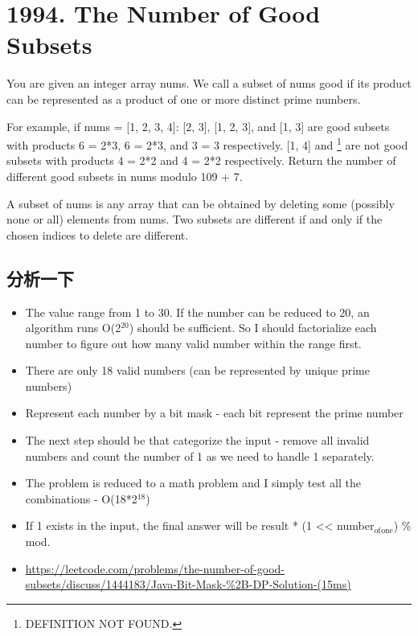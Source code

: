 \documentclass[9pt, b5paaper]{book}
\begin{document}
\section{1994. The Number of Good Subsets}
\label{sec-11-11}
You are given an integer array nums. We call a subset of nums good if its product can be represented as a product of one or more distinct prime numbers.

For example, if nums = [1, 2, 3, 4]:
[2, 3], [1, 2, 3], and [1, 3] are good subsets with products 6 = 2*3, 6 = 2*3, and 3 = 3 respectively.
[1, 4] and \footnote{DEFINITION NOT FOUND.} are not good subsets with products 4 = 2*2 and 4 = 2*2 respectively.
Return the number of different good subsets in nums modulo 109 + 7.

A subset of nums is any array that can be obtained by deleting some (possibly none or all) elements from nums. Two subsets are different if and only if the chosen indices to delete are different.
\subsection{分析一下}
\label{sec-11-11-1}
\begin{itemize}
\item The value range from 1 to 30. If the number can be reduced to 20, an algorithm runs O(2$^{\text{20}}$) should be sufficient. So I should factorialize each number to figure out how many valid number within the range first.
\item There are only 18 valid numbers (can be represented by unique prime numbers)
\item Represent each number by a bit mask - each bit represent the prime number
\item The next step should be that categorize the input - remove all invalid numbers and count the number of 1 as we need to handle 1 separately.
\item The problem is reduced to a math problem and I simply test all the combinations - O(18*2$^{\text{18}}$)
\item If 1 exists in the input, the final answer will be result * (1 << number$_{\text{of}}$$_{\text{one}}$) \% mod.
\item \url{https://leetcode.com/problems/the-number-of-good-subsets/discuss/1444183/Java-Bit-Mask-\%2B-DP-Solution-(15ms)}
\end{itemize}
\end{document}
